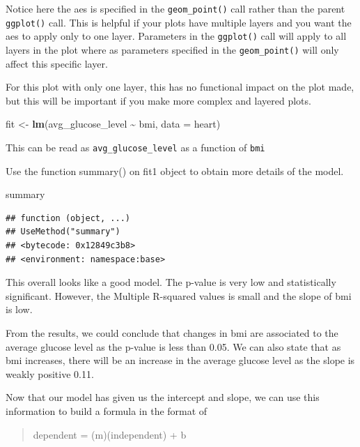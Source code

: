 \documentclass[
]{book}
\newenvironment{Shaded}{\begin{snugshade}}{\end{snugshade}}
\newcommand{\AttributeTok}[1]{\textcolor[rgb]{0.13,0.29,0.53}{#1}}
\newcommand{\FunctionTok}[1]{\textcolor[rgb]{0.13,0.29,0.53}{\textbf{#1}}}
\newcommand{\NormalTok}[1]{#1}
\newcommand{\OtherTok}[1]{\textcolor[rgb]{0.56,0.35,0.01}{#1}}
\newcommand{\SpecialCharTok}[1]{\textcolor[rgb]{0.81,0.36,0.00}{\textbf{#1}}}
\begin{document}
Notice here the aes is specified in the \texttt{geom\_point()} call rather than the parent \texttt{ggplot()} call. This is helpful if your plots have multiple layers and you want the aes to apply only to one layer. Parameters in the \texttt{ggplot()} call will apply to all layers in the plot where as parameters specified in the \texttt{geom\_point()} will only affect this specific layer.

For this plot with only one layer, this has no functional impact on the plot made, but this will be important if you make more complex and layered plots.

\begin{Shaded}
\begin{Highlighting}[]
\NormalTok{fit }\OtherTok{\textless{}{-}} \FunctionTok{lm}\NormalTok{(avg\_glucose\_level }\SpecialCharTok{\textasciitilde{}}\NormalTok{ bmi, }\AttributeTok{data =}\NormalTok{ heart)}
\end{Highlighting}
\end{Shaded}

This can be read as \texttt{avg\_glucose\_level} as a function of \texttt{bmi}

Use the function summary() on fit1 object to obtain more details of the model.

\begin{Shaded}
\begin{Highlighting}[]
\NormalTok{summary}
\end{Highlighting}
\end{Shaded}

\begin{verbatim}
## function (object, ...) 
## UseMethod("summary")
## <bytecode: 0x12849c3b8>
## <environment: namespace:base>
\end{verbatim}

This overall looks like a good model. The p-value is very low and statistically significant. However, the Multiple R-squared values is small and the slope of bmi is low.

From the results, we could conclude that changes in bmi are associated to the average glucose level as the p-value is less than 0.05. We can also state that as bmi increases, there will be an increase in the average glucose level as the slope is weakly positive 0.11.

Now that our model has given us the intercept and slope, we can use this information to build a formula in the format of

\begin{quote}
dependent = (m)(independent) + b
\end{quote}
\end{document}
